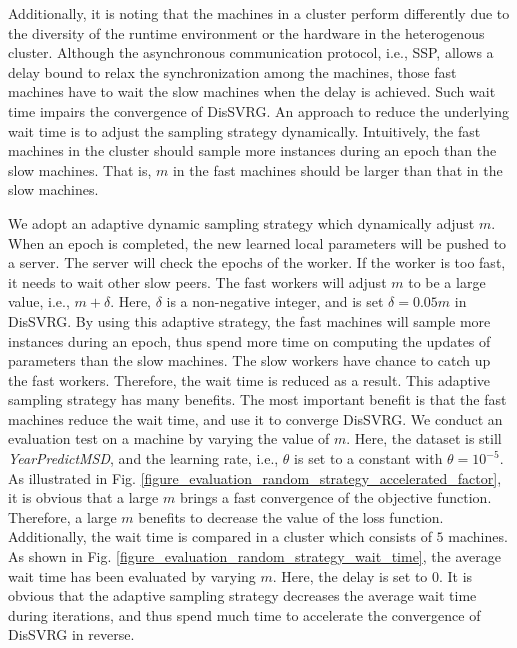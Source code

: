 \documentclass[10pt,journal,finalsubmission,compsoc]{IEEEtran}
\begin{document}
Additionally, it is noting that the machines in a cluster perform differently due to the diversity of the runtime environment or the hardware in the heterogenous cluster.  Although the asynchronous communication protocol, i.e., SSP, allows a delay bound to relax the synchronization among the machines, those fast machines have to wait the slow machines when the delay is achieved. Such wait time impairs the convergence of DisSVRG. An approach to reduce the underlying wait time is to adjust the sampling strategy dynamically.  Intuitively, the fast machines in the cluster should sample more instances during an epoch than the slow machines. That is, $m$ in the fast machines should be larger than that in the slow machines. 

We adopt an adaptive dynamic sampling strategy which dynamically adjust $m$. When an epoch is completed, the new learned local parameters will be pushed to a server. The server will check the epochs of the worker. If the worker is too fast, it needs to wait other slow peers.  The fast workers will adjust  $m$ to be a large value, i.e., $m+\delta$. Here, $\delta$ is a non-negative integer, and is set $\delta=0.05m$ in DisSVRG. By using this adaptive strategy, the fast machines will sample more instances during an epoch, thus spend more time on computing the updates of parameters than the slow machines. The slow workers have chance to catch up the fast workers. Therefore, the wait time is reduced as a result. This adaptive sampling strategy has many benefits. The most important benefit is that the fast machines reduce the wait time, and use it  to converge DisSVRG. We conduct an evaluation test on a  machine by varying the value of $m$. Here, the dataset is still \emph{YearPredictMSD}, and the learning rate, i.e., $\theta$ is set to a constant with $\theta=10^{-5}$. As illustrated in Fig. \ref{figure_evaluation_random_strategy_accelerated_factor},  it is obvious that a large $m$ brings a fast convergence of the objective function. Therefore, a large $m$ benefits to decrease the value of the loss function. Additionally, the wait time is compared in a cluster which consists of $5$ machines.   As shown in Fig. \ref{figure_evaluation_random_strategy_wait_time}, the average wait time has been evaluated by varying $m$. Here, the delay is set to $0$.  It is obvious that the adaptive sampling strategy  decreases the average wait time during iterations, and thus spend much time to accelerate the convergence of DisSVRG in reverse. 
\end{document}
